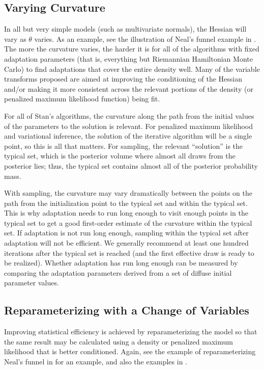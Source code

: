 \subsection{Varying Curvature}

In all but very simple models (such as multivariate normals), the
Hessian will vary as $\theta$ varies.  As an example, see the
illustration of Neal's funnel example in .  The more
the curvature varies, the harder it is for all of the algorithms with
fixed adaptation parameters (that is, everything but Riemannian
Hamiltonian Monte Carlo) to find adaptations that cover the entire
density well.  Many of the variable transforms proposed are aimed at
improving the conditioning of the Hessian and/or making it more
consistent across the relevant portions of the density (or penalized
maximum likelihood function) being fit.

For all of Stan's algorithms, the curvature along the path from the
initial values of the parameters to the solution is relevant.  For
penalized maximum likelihood and variational inference, the solution
of the iterative algorithm will be a single point, so this is all that
matters.  For sampling, the relevant ``solution'' is the typical set,
which is the posterior volume where almost all draws from the
posterior lies;  thus, the typical set contains almost all of the
posterior probability mass.

With sampling, the curvature may vary dramatically between the points
on the path from the initialization point to the typical set and
within the typical set.  This is why adaptation needs to run long
enough to visit enough points in the typical set to get a good
first-order estimate of the curvature within the typical set.  If
adaptation is not run long enough, sampling within the typical set
after adaptation will not be efficient.  We generally recommend at
least one hundred iterations after the typical set is reached (and the
first effective draw is ready to be realized).  Whether adaptation has
run long enough can be measured by comparing the adaptation parameters
derived from a set of diffuse initial parameter values.


\subsection{Reparameterizing with a Change of Variables}

Improving statistical efficiency is achieved by reparameterizing the
model so that the same result may be calculated using a density or
penalized maximum likelihood that is better conditioned.  Again, see
the example of reparameterizing Neal's funnel in 
for an example, and also the examples in
.

